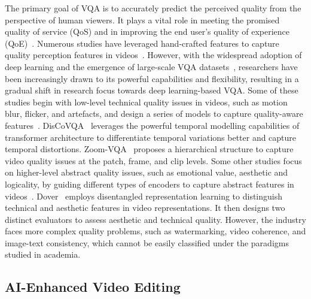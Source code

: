 The primary goal of VQA is to accurately predict the perceived quality from the perspective of human viewers. It plays a vital role in meeting the promised quality of service (QoS) and in improving the end user’s quality of experience (QoE)~\cite{chikkerur2011objective}.
Numerous studies have leveraged hand-crafted features to capture quality perception features in videos~\cite{Saad_Bovik_Charrier_2014, Mittal_Saad_Bovik_2016, Korhonen_2019, Tu_Wang_Birkbeck_Adsumilli_Bovik_2021}. 
However, with the widespread adoption of deep learning and the emergence of large-scale VQA datasets~\cite{hosu2017konstanz, Wang_Inguva_Adsumilli_2019, Ying_Maniratnam_Ghadiyaram_Bovik_2020, Zhang_Wu_Sun_Tu_Lu_Min_Chen_Zhai_2023}, researchers have been increasingly drawn to its powerful capabilities and flexibility, resulting in a gradual shift in research focus towards deep learning-based VQA.
Some of these studies begin with low-level technical quality issues in videos, such as motion blur, flicker, and artefacts, and design a series of models to capture quality-aware features~\cite{Wu_Chen_Liao_Hou_Sun_Yan_Lin_2022, zhao2023zoom, Ying_Maniratnam_Ghadiyaram_Bovik_2020, Zhang_Wu_Sun_Tu_Lu_Min_Chen_Zhai_2023, Li_Jiang_Jiang_2019, Li_Jiang_Jiang_2021}.
DisCoVQA~\cite{Wu_Chen_Liao_Hou_Sun_Yan_Lin_2022} leverages the powerful temporal modelling capabilities of transformer architecture to differentiate temporal variations better and capture temporal distortions.
Zoom-VQA~\cite{zhao2023zoom} proposes a hierarchical structure to capture video quality issues at the patch, frame, and clip levels. 
Some other studies focus on higher-level abstract quality issues, such as emotional value, aesthetic and logicality, by guiding different types of encoders to capture abstract features in videos~\cite{wu2022disentangling, wu2023exploring, he2024cover, wu2023towards}. 
Dover~\cite{wu2022disentangling} employs disentangled representation learning to distinguish technical and aesthetic features in video representations. It then designs two distinct evaluators to assess aesthetic and technical quality.
However, the industry faces more complex quality problems, such as watermarking, video coherence, and image-text consistency, which cannot be easily classified under the paradigms studied in academia.


\subsection{AI-Enhanced Video Editing}

